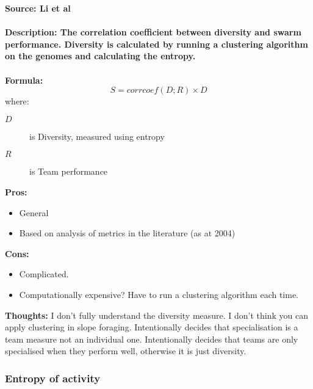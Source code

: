 \documentclass[12pt]{article}
\begin{document}
\textbf{Source: Li et al \cite{li:AB:2004}} \\\\
\textbf{Description: The correlation coefficient between diversity and swarm performance.
Diversity is calculated by running a clustering algorithm on the genomes and calculating the entropy.} \\\\
\textbf{Formula: }\\
%
\[
S = corrcoef(D;R) \times D
\]
%
where:
\begin{description}
\item[$D$] is Diversity, measured using entropy
\item[$R$] is Team performance
\end{description}
\textbf{Pros:}
\begin{itemize}
\item General
\item Based on analysis of metrics in the literature (as at 2004)
\end{itemize}
\textbf{Cons:}
\begin{itemize}
\item Complicated. 
\item Computationally expensive? Have to run a clustering algorithm each time.
\end{itemize}
\textbf{Thoughts:} I don't fully understand the diversity measure. 
I don't think you can apply clustering in slope foraging.
Intentionally decides that specialisation is a team measure not an individual one.
Intentionally decides that teams are only specialised when they perform well, otherwise it is just diversity.
\\

\subsubsection{Entropy of activity}
\end{document}
